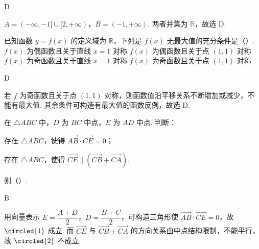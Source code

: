 \begin{answer}
D
\end{answer}

\begin{solution}
\(A=(-\infty,-1]\cup[2,+\infty)\)，\(B=(-1,+\infty)\). 两者并集为 \(\mathbb R\)，故选 D.
\end{solution}

\begin{problem}
已知函数 \(y=f(x)\) 的定义域为 \(\mathbb R\)，下列是 \(f(x)\) 无最大值的充分条件是（\quad）.
\choices
    {\(f(x)\) 为偶函数且关于直线 \(x=1\) 对称}
    {\(f(x)\) 为偶函数且关于点 \((1,1)\) 对称}
    {\(f(x)\) 为奇函数且关于直线 \(x=1\) 对称}
    {\(f(x)\) 为奇函数且关于点 \((1,1)\) 对称}
\end{problem}

\begin{answer}
D
\end{answer}

\begin{solution}
若 \(f\) 为奇函数且关于点 \((1,1)\) 对称，则函数值沿平移关系不断增加或减少，不能有最大值. 其余条件可构造有最大值的函数反例，故选 D.
\end{solution}

\begin{problem}
在 \(\triangle ABC\) 中，\(D\) 为 \(BC\) 中点，\(E\) 为 \(AD\) 中点. 判断：
\begin{circlelist}
\item 存在 \(\triangle ABC\)，使得 \(\overrightarrow{AB}\cdot\overrightarrow{CE}=0\)；
\item 存在 \(\triangle ABC\)，使得 \(\overrightarrow{CE}\parallel(\overrightarrow{CB}+\overrightarrow{CA})\).
\end{circlelist}
则（\quad）.
\end{problem}

\begin{answer}
B
\end{answer}

\begin{solution}
用向量表示 \(E=\dfrac{A+D}{2}\)，\(D=\dfrac{B+C}{2}\)，可构造三角形使 \(\overrightarrow{AB}\cdot\overrightarrow{CE}=0\)，故 \(\circled{1}\) 成立. 而 \(\overrightarrow{CE}\) 与 \(\overrightarrow{CB}+\overrightarrow{CA}\) 的方向关系由中点结构限制，不能平行，故 \(\circled{2}\) 不成立.
\end{solution}
